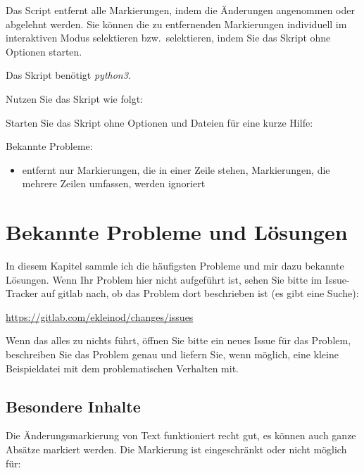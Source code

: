 
Das Script entfernt alle Markierungen, indem die Änderungen angenommen oder abgelehnt werden.
Sie können die zu entfernenden Markierungen individuell im interaktiven Modus selektieren bzw.\ selektieren, indem Sie das Skript ohne Optionen starten.

Das Skript benötigt \emph{python3}.

Nutzen Sie das Skript wie folgt:


Starten Sie das Skript ohne Optionen und Dateien für eine kurze Hilfe:


Bekannte Probleme:

\begin{itemize}
	\item entfernt nur Markierungen, die in einer Zeile stehen, Markierungen, die mehrere Zeilen umfassen, werden ignoriert
\end{itemize}



\cleardoublepage
\section{Bekannte Probleme und Lösungen}
\label{sec:known-problems}

In diesem Kapitel sammle ich die häufigsten Probleme und mir dazu bekannte Lösungen.
Wenn Ihr Problem hier nicht aufgeführt ist, sehen Sie bitte im Issue-Tracker auf gitlab nach, ob das Problem dort beschrieben ist (es gibt eine Suche):

\url{https://gitlab.com/ekleinod/changes/issues}

Wenn das alles zu nichts führt, öffnen Sie bitte ein neues Issue für das Problem, beschreiben Sie das Problem genau und liefern Sie, wenn möglich, eine kleine Beispieldatei mit dem problematischen Verhalten mit.

\subsection{Besondere Inhalte}

Die Änderungsmarkierung von Text funktioniert recht gut, es können auch ganze Absätze markiert werden.
Die Markierung ist eingeschränkt oder nicht möglich für:

